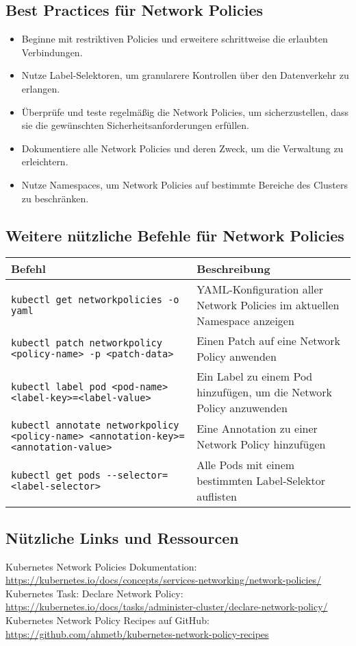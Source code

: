 \subsection{Best Practices für Network Policies}
\begin{itemize}
    \item Beginne mit restriktiven Policies und erweitere schrittweise die erlaubten Verbindungen.
    \item Nutze Label-Selektoren, um granularere Kontrollen über den Datenverkehr zu erlangen.
    \item Überprüfe und teste regelmäßig die Network Policies, um sicherzustellen, dass sie die gewünschten Sicherheitsanforderungen erfüllen.
    \item Dokumentiere alle Network Policies und deren Zweck, um die Verwaltung zu erleichtern.
    \item Nutze Namespaces, um Network Policies auf bestimmte Bereiche des Clusters zu beschränken.
\end{itemize}

\subsection{Weitere nützliche Befehle für Network Policies}
\begin{tabular}{|p{}|p{}|}
\hline
\textbf{Befehl} & \textbf{Beschreibung} \\
\hline
\texttt{kubectl get networkpolicies -o yaml} & YAML-Konfiguration aller Network Policies im aktuellen Namespace anzeigen \\
\texttt{kubectl patch networkpolicy <policy-name> -p <patch-data>} & Einen Patch auf eine Network Policy anwenden \\
\texttt{kubectl label pod <pod-name> <label-key>=<label-value>} & Ein Label zu einem Pod hinzufügen, um die Network Policy anzuwenden \\
\texttt{kubectl annotate networkpolicy <policy-name> <annotation-key>=<annotation-value>} & Eine Annotation zu einer Network Policy hinzufügen \\
\texttt{kubectl get pods {-}{-}selector=<label-selector>} & Alle Pods mit einem bestimmten Label-Selektor auflisten \\
\hline
\end{tabular}

\subsection{Nützliche Links und Ressourcen}
Kubernetes Network Policies Dokumentation:\\
\url{https://kubernetes.io/docs/concepts/services-networking/network-policies/}\\
Kubernetes Task: Declare Network Policy:\\
\url{https://kubernetes.io/docs/tasks/administer-cluster/declare-network-policy/}\\
Kubernetes Network Policy Recipes auf GitHub:\\
\url{https://github.com/ahmetb/kubernetes-network-policy-recipes}\\